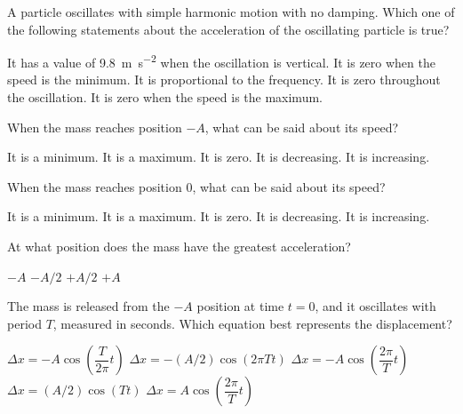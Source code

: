 \documentclass{../../../oss-ap12ibhl}
\begin{document}
\begin{questions}
  \question A particle oscillates with simple harmonic motion with no damping.
  Which one of the following statements about the acceleration of the
  oscillating particle is true?
  \begin{choices}
    \choice It has a value of \SI{9.8}{\metre\per\second\squared} when the
    oscillation is vertical.
    \choice It is zero when the speed is the minimum.
    \choice It is proportional to the frequency.
    \choice It is zero throughout the oscillation.
    \choice It is zero when the speed is the maximum.
  \end{choices}
  \newpage
  
  
  \question When the mass reaches position $-A$, what can be said about its
  speed?
  \label{one}
  \begin{choices}
    \choice It is a minimum.
    \choice It is a maximum.
    \choice It is zero.
    \choice It is decreasing.
    \choice It is increasing.
  \end{choices}
  
  \question When the mass reaches position 0, what can be said about its speed?
  \begin{choices}
    \choice It is a minimum.
    \choice It is a maximum.
    \choice It is zero.
    \choice It is decreasing.
    \choice It is increasing.
  \end{choices}
    
  \question At what position does the mass have the greatest acceleration?
  \begin{choices}
    \choice $-A$
    \choice $-A/2$
    \choice $+A/2$
    \choice $+A$
  \end{choices}
    
  \question The mass is released from the $-A$ position at time $t=0$, and it
  oscillates with period $T$, measured in seconds. Which equation best
  represents the displacement?
  \label{four}
  \begin{choices}
    \choice $\Delta x = -A\cos\left(\dfrac{T}{2\pi}t\right)$
    \choice $\Delta x = -(A/2)\cos(2\pi T t)$
    \choice $\Delta x = -A\cos\left(\dfrac{2\pi}{T}t\right)$
    \choice $\Delta x = (A/2)\cos(T t)$
    \choice $\Delta x = A\cos\left(\dfrac{2\pi}{T}t\right)$
  \end{choices}
  \newpage


\end{questions}
\end{document}
